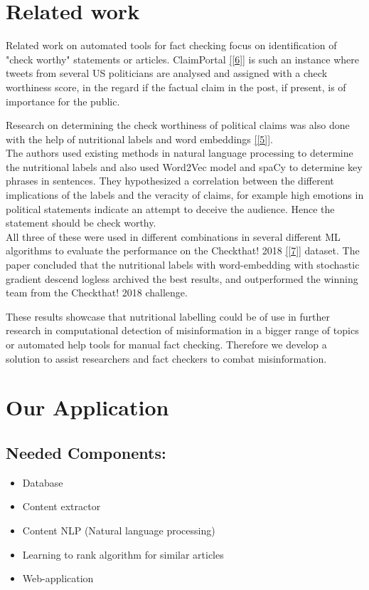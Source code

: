 \documentclass[10pt]{article}
\begin{document}
\section{Related work}
Related work on automated tools for fact checking focus on identification of "check worthy" statements or articles.
ClaimPortal \ref{[6]} is such an instance where tweets from several US politicians are analysed and assigned with a check worthiness  score, in the regard if the factual claim in the post, if present, is of importance for the public. 

Research on determining the check worthiness of political claims was also done with the help of nutritional labels and word embeddings \ref{[5]}.\\
The authors used existing methods in natural language processing to determine the nutritional labels and also used Word2Vec model and spaCy to determine key phrases in sentences.
They hypothesized a correlation between the different implications of the labels and the veracity of claims, for example high emotions in political statements indicate an attempt to deceive the audience.
 Hence the statement should be check worthy. \\
All three of these were used in different combinations in several different ML algorithms to evaluate the performance on the Checkthat! 2018 \ref{[7]} dataset.
The paper concluded that the nutritional labels with word-embedding with stochastic gradient descend logless archived the best results, and outperformed the winning team from the Checkthat! 2018 challenge.

These results showcase that nutritional labelling could be of use in further research in computational detection of misinformation in a bigger range of topics or automated help tools for manual fact checking.
Therefore we develop a solution to assist researchers and fact checkers to combat misinformation.

\section{Our Application}
\subsection{Needed Components:}
\begin{itemize}
\item Database
\item Content extractor
\item Content NLP (Natural language processing)
\item Learning to rank algorithm for similar articles
\item Web-application
\end{itemize}
\end{document}
